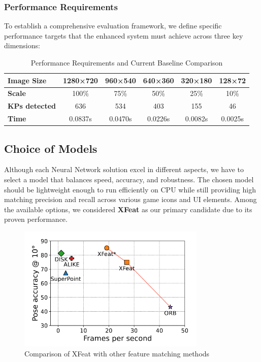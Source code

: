 \subsubsection{Performance Requirements}
To establish a comprehensive evaluation framework, we define specific
performance targets that the enhanced system must achieve across three key
dimensions:

\begin{table}[h]
    \centering
    \begin{tabular}{|l|c|c|c|c|c|}
        \hline
        \textbf{Image Size}   & 1280×720 & 960×540 & 640×360 & 320×180 & 128×72  \\
        \hline
        \textbf{Scale}        & 100\%    & 75\%    & 50\%    & 25\%    & 10\%    \\
        \hline
        \textbf{KPs detected} & 636      & 534     & 403     & 155     & 46      \\
        \hline
        \textbf{Time}         & 0.0837s  & 0.0470s & 0.0226s & 0.0082s & 0.0025s \\
        \hline
    \end{tabular}
    \caption{Performance Requirements and Current Baseline Comparison}
    \label{tab:performance_requirements}
\end{table}
\subsection{Choice of Models}
Although each Neural Network solution excel in different aspects, we have to
select a model that balances speed, accuracy, and robustness. The chosen model
should be lightweight enough to run efficiently on CPU while still providing
high matching precision and recall across various game icons and UI elements.
Among the available options, we considered \textbf{XFeat} as our primary
candidate due to its proven performance.
\begin{figure}[h]
    \centering
    \includegraphics[width=0.8\textwidth]{ressources/xfeat-comparative-graph.png}
    \caption{Comparison of XFeat with other feature matching methods}
    \label{fig:xfeat_architecture}
\end{figure}
